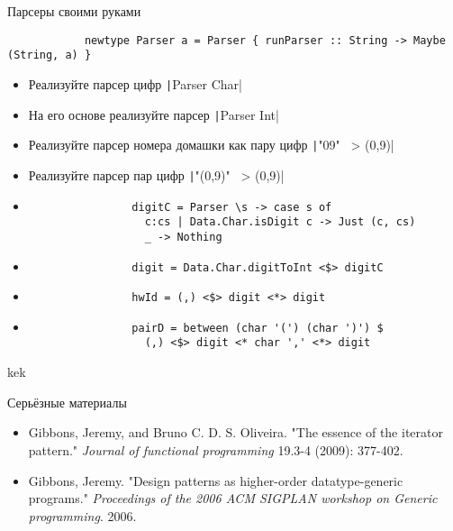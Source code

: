     \begin{frame}[fragile]{Парсеры своими руками}
        \begin{verbatim}
            newtype Parser a = Parser { runParser :: String -> Maybe (String, a) }
        \end{verbatim}
        \begin{itemize}
            \item[\todo] Реализуйте парсер цифр \texttt|Parser Char|
            \item[\todo] На его основе реализуйте парсер \texttt|Parser Int|
            \item[\todo] Реализуйте парсер номера домашки как пару цифр \texttt|"09" ~> (0,9)|
            \item[\todo] Реализуйте парсер пар цифр \texttt|"(0,9)" ~> (0,9)|
            \item[\answer] \pause
            \begin{verbatim}
                digitC = Parser \s -> case s of
                  c:cs | Data.Char.isDigit c -> Just (c, cs)
                  _ -> Nothing
            \end{verbatim}
            \item[\answer] \pause
            \begin{verbatim}
                digit = Data.Char.digitToInt <$> digitC
            \end{verbatim}
            \item[\answer] \pause
            \begin{verbatim}
                hwId = (,) <$> digit <*> digit
            \end{verbatim}
            \item[\answer] \pause
            \begin{verbatim}
                pairD = between (char '(') (char ')') $
                  (,) <$> digit <* char ',' <*> digit
            \end{verbatim}
        \end{itemize}
    \end{frame}
    
    \begin{frame}[fragile]{}
        kek
    \end{frame}


    \begin{frame}[fragile]{Серьёзные материалы}
        \begin{itemize}
            \item Gibbons, Jeremy, and Bruno C. D. S. Oliveira. "The essence of the iterator pattern." \textit{Journal of functional programming} 19.3-4 (2009): 377-402.
            \item Gibbons, Jeremy. "Design patterns as higher-order datatype-generic programs." \textit{Proceedings of the 2006 ACM SIGPLAN workshop on Generic programming}. 2006.
        \end{itemize}
    \end{frame}


